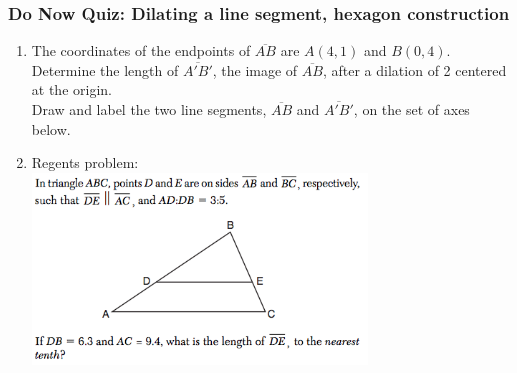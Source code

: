 \documentclass[12pt, twoside]{article}
\begin{document}
\subsubsection*{Do Now Quiz: Dilating a line segment, hexagon construction}
 \begin{enumerate}

   \item The coordinates of the endpoints of $\overline{AB}$ are $A(4,1)$ and $B(0,4)$. Determine the length of $\overline{A'B'}$, the image of  $\overline{AB}$, after a dilation of 2 centered at the origin.\\[0.25cm]
   Draw and label the two line segments,  $\overline{AB}$ and  $\overline{A'B'}$, on the set of axes below.
   \vspace{9cm}
   \begin{center}
   \end{center}

  \newpage
  \item Regents problem:\\
  \includegraphics[width=0.7\textwidth]{similarity-ratio-spicy.png}\\[0.5cm]
  \vspace{2cm}


\end{enumerate}
\end{document}
